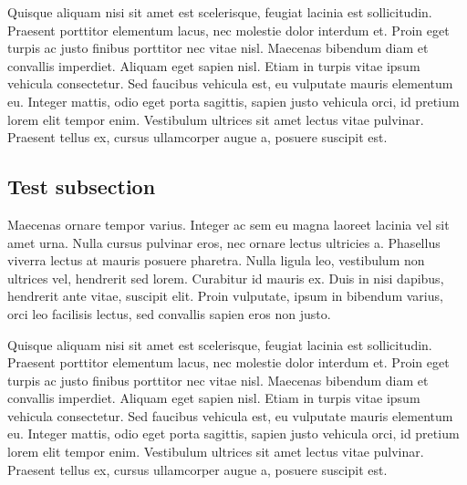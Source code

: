 Quisque aliquam nisi sit amet est scelerisque, feugiat lacinia est sollicitudin. Praesent porttitor elementum lacus, nec molestie dolor interdum et. Proin eget turpis ac justo finibus porttitor nec vitae nisl. Maecenas bibendum diam et convallis imperdiet. Aliquam eget sapien nisl. Etiam in turpis vitae ipsum vehicula consectetur. Sed faucibus vehicula est, eu vulputate mauris elementum eu. Integer mattis, odio eget porta sagittis, sapien justo vehicula orci, id pretium lorem elit tempor enim. Vestibulum ultrices sit amet lectus vitae pulvinar. Praesent tellus ex, cursus ullamcorper augue a, posuere suscipit est.

\subsection{Test subsection}
Maecenas ornare tempor varius. Integer ac sem eu magna laoreet lacinia vel sit amet urna. Nulla cursus pulvinar eros, nec ornare lectus ultricies a. Phasellus viverra lectus at mauris posuere pharetra. Nulla ligula leo, vestibulum non ultrices vel, hendrerit sed lorem. Curabitur id mauris ex. Duis in nisi dapibus, hendrerit ante vitae, suscipit elit. Proin vulputate, ipsum in bibendum varius, orci leo facilisis lectus, sed convallis sapien eros non justo.

Quisque aliquam nisi sit amet est scelerisque, feugiat lacinia est sollicitudin. Praesent porttitor elementum lacus, nec molestie dolor interdum et. Proin eget turpis ac justo finibus porttitor nec vitae nisl. Maecenas bibendum diam et convallis imperdiet. Aliquam eget sapien nisl. Etiam in turpis vitae ipsum vehicula consectetur. Sed faucibus vehicula est, eu vulputate mauris elementum eu. Integer mattis, odio eget porta sagittis, sapien justo vehicula orci, id pretium lorem elit tempor enim. Vestibulum ultrices sit amet lectus vitae pulvinar. Praesent tellus ex, cursus ullamcorper augue a, posuere suscipit est.
